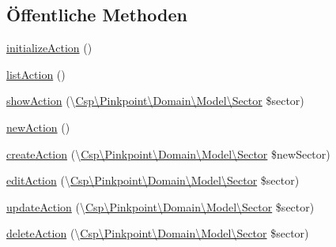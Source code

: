 \subsection*{Öffentliche Methoden}
\begin{DoxyCompactItemize}
\item 
\hyperlink{classCsp_1_1Pinkpoint_1_1Controller_1_1SectorController_a49531200dc5007538d0cb98230077878}{initialize\+Action} ()
\item 
\hyperlink{classCsp_1_1Pinkpoint_1_1Controller_1_1SectorController_a00545ebbd3ccb9d24814e6b84168a99c}{list\+Action} ()
\item 
\hyperlink{classCsp_1_1Pinkpoint_1_1Controller_1_1SectorController_abaf72661c03b9a82042c89bcd793cc9c}{show\+Action} (\textbackslash{}\hyperlink{classCsp_1_1Pinkpoint_1_1Domain_1_1Model_1_1Sector}{Csp\textbackslash{}\+Pinkpoint\textbackslash{}\+Domain\textbackslash{}\+Model\textbackslash{}\+Sector} \$sector)
\item 
\hyperlink{classCsp_1_1Pinkpoint_1_1Controller_1_1SectorController_af823dfbc5e6f48665540da921c2a19dd}{new\+Action} ()
\item 
\hyperlink{classCsp_1_1Pinkpoint_1_1Controller_1_1SectorController_af8f5fd6220b00401c8c2a56cd28b39dc}{create\+Action} (\textbackslash{}\hyperlink{classCsp_1_1Pinkpoint_1_1Domain_1_1Model_1_1Sector}{Csp\textbackslash{}\+Pinkpoint\textbackslash{}\+Domain\textbackslash{}\+Model\textbackslash{}\+Sector} \$new\+Sector)
\item 
\hyperlink{classCsp_1_1Pinkpoint_1_1Controller_1_1SectorController_a602c09943a6795161e7d735e0a3e663f}{edit\+Action} (\textbackslash{}\hyperlink{classCsp_1_1Pinkpoint_1_1Domain_1_1Model_1_1Sector}{Csp\textbackslash{}\+Pinkpoint\textbackslash{}\+Domain\textbackslash{}\+Model\textbackslash{}\+Sector} \$sector)
\item 
\hyperlink{classCsp_1_1Pinkpoint_1_1Controller_1_1SectorController_a1733fa77cbb2d0bd11b22c95011deb53}{update\+Action} (\textbackslash{}\hyperlink{classCsp_1_1Pinkpoint_1_1Domain_1_1Model_1_1Sector}{Csp\textbackslash{}\+Pinkpoint\textbackslash{}\+Domain\textbackslash{}\+Model\textbackslash{}\+Sector} \$sector)
\item 
\hyperlink{classCsp_1_1Pinkpoint_1_1Controller_1_1SectorController_ad95e4bf897df43355c54fd6bf68b4b4a}{delete\+Action} (\textbackslash{}\hyperlink{classCsp_1_1Pinkpoint_1_1Domain_1_1Model_1_1Sector}{Csp\textbackslash{}\+Pinkpoint\textbackslash{}\+Domain\textbackslash{}\+Model\textbackslash{}\+Sector} \$sector)
\item 

\end{DoxyCompactItemize}
